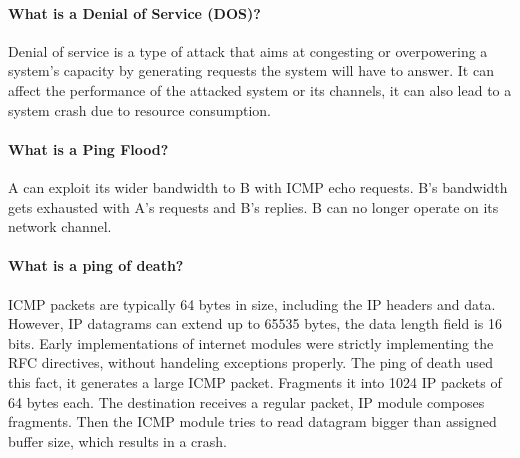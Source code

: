 \paragraph{What is a Denial of Service (DOS)?}
Denial of service is a type of attack that aims at congesting or overpowering a system's capacity by generating requests the system will have to answer. It can affect the performance of the attacked system or its channels, it can also lead to a system crash due to resource consumption.

\paragraph{What is a Ping Flood?}
A can exploit its wider bandwidth to B with ICMP echo requests. B's bandwidth gets exhausted with A's requests and B's replies. B can no longer operate on its network channel.

\paragraph{What is a ping of death?}
ICMP packets are typically 64 bytes in size, including the IP headers and data. However, IP datagrams can extend up to 65535 bytes, the data length field is 16 bits. Early implementations of internet modules were strictly implementing the RFC directives, without handeling exceptions properly. The ping of death used this fact, it generates a large ICMP packet. Fragments it into 1024 IP packets of 64 bytes each. The destination receives a regular packet, IP module composes fragments. Then the ICMP module tries to read datagram bigger than assigned buffer size, which results in a crash.